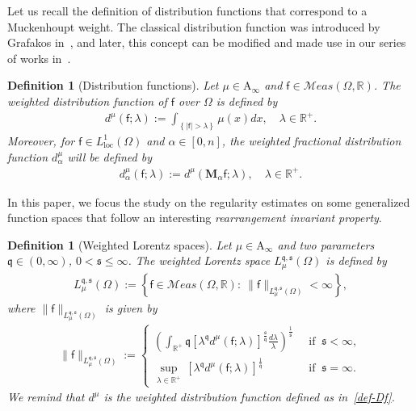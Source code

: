 \documentclass[a4paper, 11pt]{article}
\newtheorem{definition}[theorem]{Definition}
\begin{document}
Let us recall the definition of distribution functions that correspond to a Muckenhoupt weight. The classical distribution function was introduced by Grafakos in~\cite{Grafakos}, and later, this concept can be modified and made use in our series of works in~\cite{NT20, PNJFA, MPT2018, PNJDE, NTT23, TN19-2, PNJMAA}. 

\begin{definition}[Distribution functions]
\label{def:WFMD}
Let $\mu \in \mathrm{A}_{\infty}$ and $\mathsf{f} \in \mathcal{M}eas(\Omega,\mathbb{R})$. The weighted distribution function of $\mathsf{f}$ over $\Omega$ is defined by
\begin{align}\label{def-Df}
d^{\mu}(\mathsf{f};\lambda) := \int_{\left\{|\mathsf{f}|> \lambda\right\}} \mu(x) dx, \quad \lambda \in \mathbb{R}^+.
\end{align}
Moreover, for $\mathsf{f} \in L^1_{\mathrm{loc}}(\Omega)$ and $\alpha \in [0,n]$, the weighted fractional distribution function $d^{\mu}_{\alpha}$ will be defined by
\begin{align}\label{def-Df-al}
d^{\mu}_{\alpha}(\mathsf{f};\lambda) := d^{\mu}(\mathbf{M}_{\alpha}\mathsf{f};\lambda), \quad \lambda \in \mathbb{R}^+.
\end{align}
\end{definition}

In this paper, we focus the study on the regularity estimates on some generalized function spaces that follow an interesting \emph{rearrangement invariant property}. 

\begin{definition}[Weighted Lorentz spaces] Let $\mu \in \mathrm{A}_{\infty}$ and two parameters $\mathfrak{q} \in (0,\infty)$, $0 < \mathfrak{s}\le \infty$. The weighted Lorentz space $L^{\mathfrak{q},\mathfrak{s}}_{\mu}(\Omega)$ is defined by
\begin{align*}
L^{\mathfrak{q},\mathfrak{s}}_{\mu}(\Omega) :=\left\{\mathsf{f} \in \mathcal{M}eas(\Omega,\mathbb{R}): \ \|\mathsf{f}\|_{L^{\mathfrak{q},\mathfrak{s}}_{\mu}(\Omega)}<\infty\right\},
\end{align*}
where $\|\mathsf{f}\|_{L^{\mathfrak{q},\mathfrak{s}}_{\mu}(\Omega)}$ is given by
\begin{align}\label{w-Lor-norm}
\|\mathsf{f}\|_{L^{\mathfrak{q},\mathfrak{s}}_{\mu}(\Omega)} :=  \begin{cases} \left( \displaystyle{\int_{\mathbb{R}^+} \mathfrak{q} \left[\lambda^{\mathfrak{q}} d^{\mu}(\mathsf{f};\lambda)\right]^{\frac{\mathfrak{s}}{\mathfrak{q}}} \frac{d\lambda}{\lambda}} \right)^{\frac{1}{\mathfrak{s}}} \ &\mbox{ if } \ \mathfrak{s} < \infty,\\  
\displaystyle{\sup_{\lambda \in \mathbb{R}^+} \, \left[\lambda^{\mathfrak{q}} d^{\mu}(\mathsf{f};\lambda)\right]^{\frac{1}{\mathfrak{q}}}} \ &\mbox{ if } \ \mathfrak{s} = \infty.\end{cases}
\end{align}
We remind that $d^{\mu}$ is the weighted distribution function defined as in~\eqref{def-Df}.
\end{definition}
\end{document}
